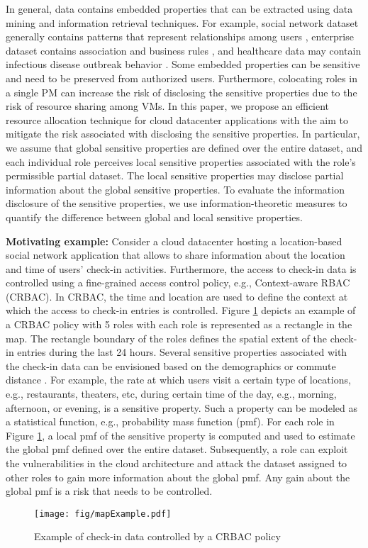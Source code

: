 In general, data contains embedded properties that can be extracted using data mining and information retrieval techniques. For example, social network dataset generally contains patterns that represent relationships among users \cite{cho2011friendship}, enterprise dataset contains association and business rules \cite{verykios2004association}, and healthcare data may contain infectious disease outbreak behavior \cite{lu2010prospective}. Some embedded properties can be sensitive and need to be preserved from authorized users. Furthermore, colocating roles in a single PM can increase the risk of disclosing the sensitive properties due to the risk of resource sharing among VMs. In this paper, we propose an efficient resource allocation technique for cloud datacenter applications with the aim to mitigate the risk associated with disclosing the sensitive properties. In particular, we assume that global sensitive properties are defined over the entire dataset, and each individual role perceives local sensitive properties associated with the role's permissible partial dataset. The local sensitive properties may disclose partial information about the global sensitive properties. To evaluate the information disclosure of the sensitive properties, we use information-theoretic measures to quantify the difference between global and local sensitive properties. 

\textbf{Motivating example:} Consider a cloud datacenter hosting a location-based social network application that allows to share information about the location and time of users' check-in activities. Furthermore, the access to check-in data is controlled using a fine-grained access control policy, e.g., Context-aware RBAC (CRBAC). In CRBAC, the time and location are used to define the context at which the access to check-in entries is controlled. Figure \ref{ch6:fig:map} depicts an example of a CRBAC policy with 5 roles with each role  is represented as a rectangle in the map. The rectangle boundary of the roles defines the spatial extent of the check-in entries during the last 24 hours. Several sensitive properties associated with the check-in data can be envisioned based on the demographics \cite{dong2014inferring} or commute distance \cite{cho2011friendship}. For example, the rate at which users visit a certain type of locations, e.g., restaurants, theaters, etc, during certain time of the day, e.g., morning, afternoon, or evening, is a sensitive property. Such a property can be modeled as a statistical function, e.g., probability mass function (pmf). For each role in Figure \ref{ch6:fig:map}, a local pmf of the sensitive property is computed and used to estimate the global pmf defined over the entire dataset. Subsequently, a role can exploit the vulnerabilities in the cloud architecture and attack the dataset assigned to other roles to gain more information about the global pmf. Any gain about the global pmf is a risk that needs to be controlled. 
\begin{figure}[t!]
\centering
\texttt{[image: fig/mapExample.pdf]}
\caption{Example of check-in data controlled by a CRBAC policy}
\label{ch6:fig:map}
\end{figure}


